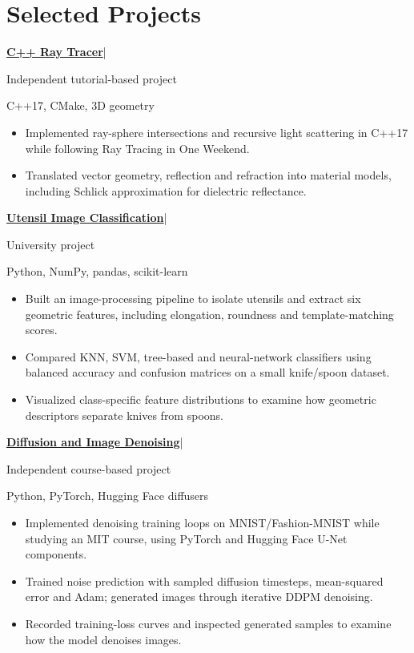 \documentclass[11pt,a4paper]{article}
\newcommand{\entry}[2]{\textbf{#1}\enspace|\enspace{\small #2}\par}
\begin{document}
\section{Selected Projects}
\entry{\href{https://github.com/Javpato/RayTracingProject}{C++ Ray Tracer}}{2025}
{\small Independent tutorial-based project}\par
{\small C++17, CMake, 3D geometry}\par
\begin{itemize}
\item Implemented ray-sphere intersections and recursive light scattering in C++17 while following Ray Tracing in One Weekend.
\item Translated vector geometry, reflection and refraction into material models, including Schlick approximation for dielectric reflectance.
\end{itemize}
\entry{\href{https://github.com/Javpato/Data-Science-Spoon-knives}{Utensil Image Classification}}{2026}
{\small University project}\par
{\small Python, NumPy, pandas, scikit-learn}\par
\begin{itemize}
\item Built an image-processing pipeline to isolate utensils and extract six geometric features, including elongation, roundness and template-matching scores.
\item Compared KNN, SVM, tree-based and neural-network classifiers using balanced accuracy and confusion matrices on a small knife/spoon dataset.
\item Visualized class-specific feature distributions to examine how geometric descriptors separate knives from spoons.
\end{itemize}
\entry{\href{https://github.com/Javpato/diffusion-model}{Diffusion and Image Denoising}}{2026}
{\small Independent course-based project}\par
{\small Python, PyTorch, Hugging Face diffusers}\par
\begin{itemize}
\item Implemented denoising training loops on MNIST/Fashion-MNIST while studying an MIT course, using PyTorch and Hugging Face U-Net components.
\item Trained noise prediction with sampled diffusion timesteps, mean-squared error and Adam; generated images through iterative DDPM denoising.
\item Recorded training-loss curves and inspected generated samples to examine how the model denoises images.
\end{itemize}
\end{document}
